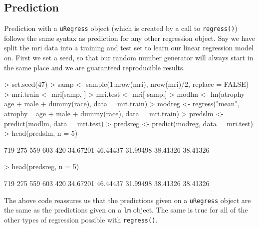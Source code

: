 \documentclass[landscape]{article}
\renewenvironment{Schunk}{\vspace{\topsep}}{\vspace{\topsep}}
\begin{document}
\subsection{Prediction}
Prediction with a \texttt{uRegress} object (which is created by a call to \texttt{regress()}) follows the same syntax as prediction for any other regression object. Say we have split the mri data into a training and test set to learn our linear regression model on. First we set a seed, so that our random number generator will always start in the same place and we are guaranteed reproducible results.
\begin{Schunk}
\begin{Sinput}
> set.seed(47)
> samp <- sample(1:nrow(mri), nrow(mri)/2, replace = FALSE)
> mri.train <- mri[samp, ]
> mri.test <- mri[-samp,]
> modlm <- lm(atrophy ~ age + male + dummy(race), data = mri.train)
> modreg <- regress("mean", atrophy ~ age + male + dummy(race), data = mri.train)
> predslm <- predict(modlm, data = mri.test)
> predsreg <- predict(modreg, data = mri.test)
> head(predslm, n = 5)
\end{Sinput}
\begin{Soutput}
     719      275      559      603      420 
34.67201 46.44437 31.99498 38.41326 38.41326 
\end{Soutput}
\begin{Sinput}
> head(predsreg, n = 5)
\end{Sinput}
\begin{Soutput}
     719      275      559      603      420 
34.67201 46.44437 31.99498 38.41326 38.41326 
\end{Soutput}
\end{Schunk}

The above code reassures us that the predictions given on a \texttt{uRegress} object are the same as the predictions given on a \texttt{lm} object. The same is true for all of the other types of regression possible with \texttt{regress()}.
\end{document}
